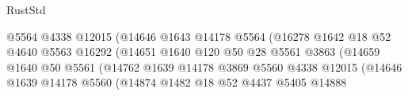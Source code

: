 \begin{lexlean}{RustStd}
\begin{coremodule}
                                                @5564
                                                @4338
                                                @12015
                                                (@14646
                                                  @1643
                                                  @14178
                                                  @5564
                                                  (@16278
                                                    @1642
                                                    @18
                                                    @52
                                                    @4640
                                                    @5563
                                                    @16292
                                                    (@14651
                                                      @1640
                                                      @120
                                                      @50
                                                      @28
                                                      @5561
                                                      @3863
                                                      (@14659
                                                        @1640
                                                        @50
                                                        @5561
                                                        (@14762
                                                          @1639
                                                          @14178
                                                          @3869
                                                          @5560
                                                          @4338
                                                          @12015
                                                          (@14646
                                                            @1639
                                                            @14178
                                                            @5560
                                                            (@14874
                                                              @1482
                                                              @18
                                                              @52
                                                              @4437
                                                              @5405
                                                              @14888

\end{coremodule}
\end{lexlean}
